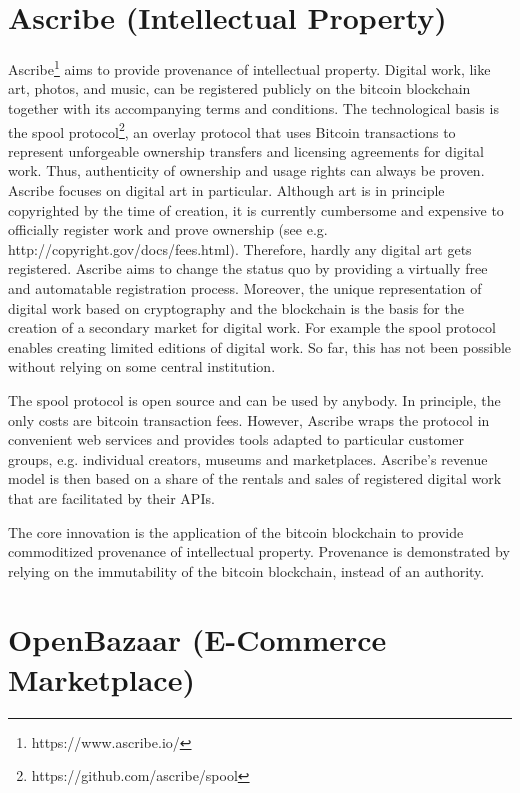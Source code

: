 {\section{Ascribe (Intellectual Property)}
\label{sec:ecoascribe}

Ascribe\footnote{https://www.ascribe.io/} aims to provide provenance of intellectual property. Digital work, 
like art, photos, and music, can be registered publicly on the bitcoin blockchain 
together with its accompanying terms and conditions. The technological basis is 
the spool protocol\footnote{https://github.com/ascribe/spool}, an overlay protocol that uses 
Bitcoin transactions to represent unforgeable ownership transfers and licensing 
agreements for digital work. Thus, authenticity of ownership and usage rights can 
always be proven. Ascribe focuses on digital art in particular. Although art is 
in principle copyrighted by the time of creation, it is currently cumbersome and 
expensive to officially register work and prove ownership (see e.g. http://copyright.gov/docs/fees.html). 
Therefore, hardly any digital art gets registered. Ascribe aims to change the status 
quo by providing a virtually free and automatable registration process. Moreover, 
the unique representation of digital work based on cryptography and the blockchain 
is the basis for the creation of a secondary market for digital work. For example 
the spool protocol enables creating limited editions of digital work. So far, this 
has not been possible without relying on some central institution.

The spool protocol is open source and can be used by anybody. In principle, the 
only costs are bitcoin transaction fees. However, Ascribe wraps the protocol in 
convenient web services and provides tools adapted to particular customer groups, 
e.g. individual creators, museums and marketplaces. Ascribe's revenue model is 
then based on a share of the rentals and sales of registered digital work that 
are facilitated by their APIs.

The core innovation is the application of the bitcoin blockchain to provide commoditized 
provenance of intellectual property. Provenance is demonstrated by relying on the 
immutability of the bitcoin blockchain, instead of an authority. 

\section{OpenBazaar (E-Commerce Marketplace)}
\label{sec:ecobazaar}

}
